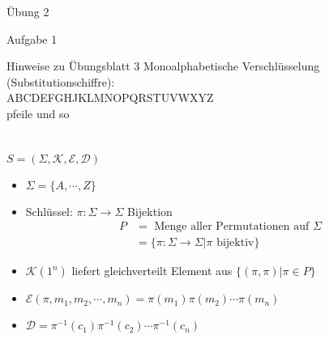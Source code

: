 \begin{section}{Übung 2}
\begin{subsection}{Aufgabe 1}
\begin{enumerate}
  \end{enumerate}

 \end{subsection}
 \begin{subsection}{Hinweise zu Übungsblatt 3}
  Monoalphabetische Verschlüsselung (Substitutionschiffre): \\
  ABCDEFGHJKLMNOPQRSTUVWXYZ\\ pfeile und so\\ \\ \\
  $S = (\Sigma, \mathcal{K}, \mathcal{E}, \mathcal{D})$ 
  \begin{itemize}
   \item $\Sigma = \{A,\cdots,Z\}$
   \item Schlüssel: $\pi : \Sigma \rightarrow \Sigma$ Bijektion
   \begin{align*}
    P &= \text{ Menge aller Permutationen auf } \Sigma \\
    &= \{\pi: \Sigma \rightarrow \Sigma | \pi \text{ bijektiv}\}
   \end{align*}
   \item $\mathcal{K}(1^n)$ liefert gleichverteilt Element aus $\{(\pi,\pi)|\pi \in P\}$
   \item $\mathcal{E}(\pi,m_1,m_2, \cdots, m_n) = \pi(m_1) \pi(m_2) \cdots \pi(m_n)$
   \item $\mathcal{D} = \pi^{-1}(c_1) \pi^{-1}(c_2) \cdots \pi^{-1}(c_n)$
  \end{itemize}
  

\end{subsection}
\end{section}
